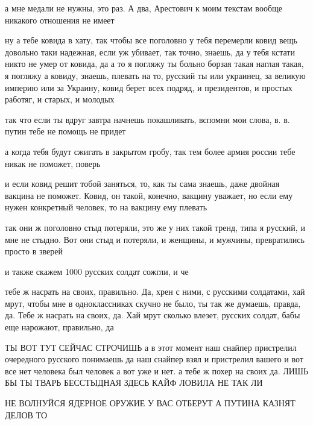 а мне медали не нужны, это раз. А два, Арестович к моим текстам вообще никакого
отношения не имеет

ну а тебе ковида в хату, так чтобы все поголовно у тебя перемерли
ковид вещь довольно таки надежная, если уж убивает, так точно, знаешь, да
у тебя кстати никто не умер от ковида, да
а то я погляжу ты больно борзая такая
наглая такая, я погляжу
а ковиду, знаешь, плевать на то, русский ты или украинец, за великую империю или за Украину, ковид берет всех подряд, и президентов, и простых работяг, и старых, и молодых

так что если ты вдруг завтра начнешь покашливать, вспомни мои слова, в. в.
путин тебе не помощь не придет

а когда тебя будут сжигать в закрытом гробу, так тем более армия россии тебе
никак не поможет, поверь

и если ковид решит тобой заняться, то, как ты сама знаешь, даже двойная вакцина
не поможет. Ковид, он такой, конечно, вакцину уважает, но если ему нужен
конкретный человек, то на вакцину ему плевать

так они ж поголовно стыд потеряли, это же у них такой тренд, типа я русский, и
мне не стыдно. Вот они стыд и потеряли, и женщины, и мужчины, превратились
просто в зверей

и также скажем 1000 русских солдат сожгли, и че

тебе ж насрать на своих, правильно. Да, хрен с ними, с русскими солдатами, хай
мрут, чтобы мне в одноклассниках скучно не было, ты так же думаешь, правда, да.
Тебе ж насрать на своих, да. Хай мрут сколько влезет, русских солдат, бабы еще
нарожают, правильно, да

ТЫ ВОТ ТУТ СЕЙЧАС СТРОЧИШЬ а в этот момент наш снайпер пристрелил очередного
русского понимаешь да наш снайпер взял и пристрелил вашего и вот все нет
человека был человек а вот уже и нет. а тебе ж похер на своих да.  ЛИШЬ БЫ ТЫ
ТВАРЬ БЕССТЫДНАЯ ЗДЕСЬ КАЙФ ЛОВИЛА НЕ ТАК ЛИ

НЕ ВОЛНУЙСЯ ЯДЕРНОЕ ОРУЖИЕ У ВАС ОТБЕРУТ А ПУТИНА КАЗНЯТ ДЕЛОВ ТО

